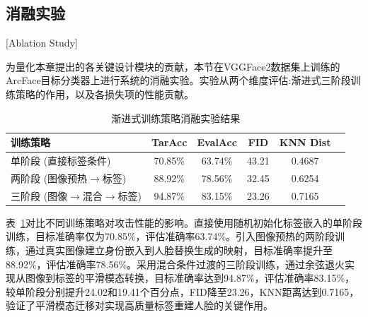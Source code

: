 \subsection{消融实验}[Ablation Study]
\label{sec:mia_ablation}

为量化本章提出的各关键设计模块的贡献，本节在VGGFace2数据集上训练的ArcFace目标分类器上进行系统的消融实验。实验从两个维度评估:渐进式三阶段训练策略的作用，以及各损失项的性能贡献。
\begin{table}[htbp]
  \centering
  \caption{渐进式训练策略消融实验结果}
  \label{tab:mia_training_ablation}
  \begin{tabular}{lccccc}
    \hline
    训练策略 & TarAcc & EvalAcc & FID & KNN Dist \\
    \hline
    单阶段 (直接标签条件) & 70.85\% & 63.74\% & 43.21 & 0.4687 \\
    两阶段 (图像预热$\rightarrow$标签) & 88.92\% & 78.56\% & 32.45 & 0.6254 \\
    三阶段 (图像$\rightarrow$混合$\rightarrow$标签) & 94.87\% & 83.15\% & 23.26 & 0.7165 \\
    \hline
  \end{tabular}
\end{table}

表~\ref{tab:mia_training_ablation}对比不同训练策略对攻击性能的影响。直接使用随机初始化标签嵌入的单阶段训练，目标准确率仅为70.85\%，评估准确率63.74\%。引入图像预热的两阶段训练，通过真实图像建立身份嵌入到人脸替换生成的映射，目标准确率提升至88.92\%，评估准确率78.56\%。采用混合条件过渡的三阶段训练，通过余弦退火实现从图像到标签的平滑模态转换，目标准确率达到94.87\%，评估准确率83.15\%，较单阶段分别提升24.02和19.41个百分点，FID降至23.26，KNN距离达到0.7165，验证了平滑模态迁移对实现高质量标签重建人脸的关键作用。


